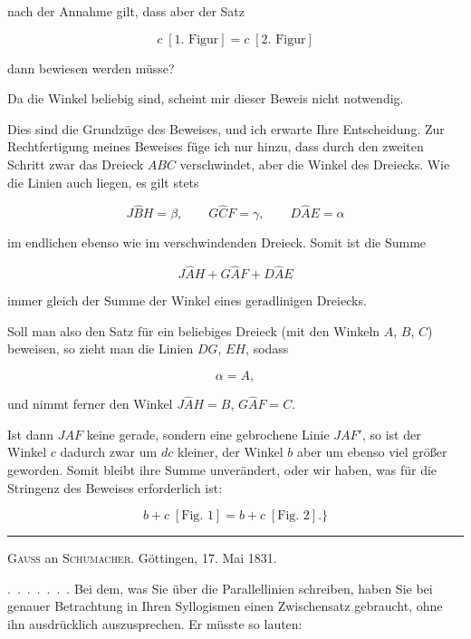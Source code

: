 %
\noindent nach der Annahme gilt, dass aber der Satz

\[ c\;[\text{1. Figur}] = c\;[\text{2. Figur}] \]

\noindent dann bewiesen werden müsse?

Da die Winkel beliebig sind, scheint mir dieser Beweis nicht notwendig.

Dies sind die Grundzüge des Beweises, und ich erwarte Ihre Entscheidung. Zur Rechtfertigung meines Beweises füge ich nur hinzu, dass durch den zweiten Schritt zwar das Dreieck $ABC$ verschwindet, aber  die Winkel des Dreiecks. Wie die Linien auch liegen, es gilt stets

\[ J\hat{B}H = \beta, \qquad G\hat{C}F = \gamma, \qquad D\hat{A}E = \alpha \]

\noindent im endlichen ebenso wie im verschwindenden Dreieck. Somit ist die Summe

\[ J\hat{A}H + G\hat{A}F + D\hat{A}E \]

\noindent immer gleich der Summe der Winkel eines geradlinigen Dreiecks.

Soll man also den Satz für ein beliebiges Dreieck (mit den Winkeln $A$, $B$, $C$) beweisen, so zieht man die Linien $DG$, $EH$, sodass

\[ \alpha = A, \]

\noindent und nimmt ferner den Winkel $J\hat{A}H = B$, $G\hat{A}F = C$.

Ist dann $JAF$ keine gerade, sondern eine gebrochene Linie $JAF'$, so ist der Winkel $c$ dadurch zwar um $dc$ kleiner, der Winkel $b$ aber um ebenso viel größer geworden. Somit bleibt ihre Summe unverändert, oder wir haben, was für die Stringenz des Beweises erforderlich ist:

\[ b + c\;[\text{Fig. 1}] = b + c\;[\text{Fig. 2}].\} \]

\bigskip
\hrule
\bigskip

\begin{center}
\textsc{Gauss} an \textsc{Schumacher}. Göttingen, 17. Mai 1831.
\end{center}

\mbox{.\ .\ .\ .\ .\ .\ .} Bei dem, was Sie über die Parallellinien schreiben, haben Sie bei genauer Betrachtung in Ihren Syllogismen einen Zwischensatz gebraucht, ohne ihn ausdrücklich auszusprechen. Er müsste so lauten:
